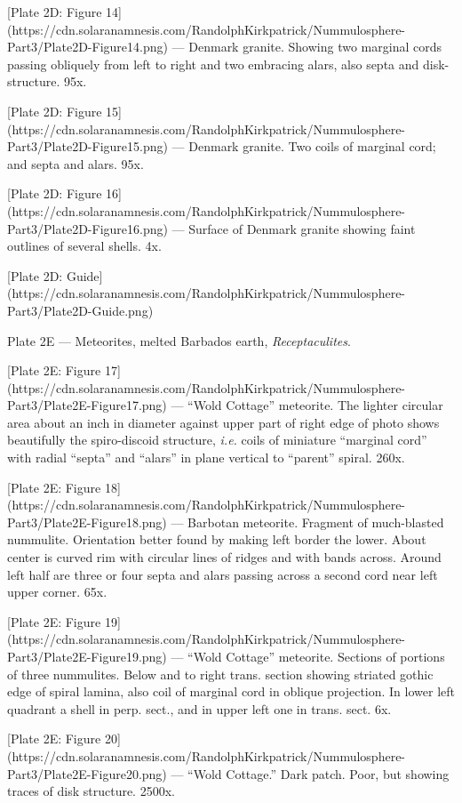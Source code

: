\documentclass[a4paper, 12pt, oneside]{article}
\begin{document}
[Plate 2D: Figure 14](https://cdn.solaranamnesis.com/RandolphKirkpatrick/Nummulosphere-Part3/Plate2D-Figure14.png) --- Denmark granite. Showing two marginal cords passing obliquely from left to right and two embracing alars, also septa and disk-structure. 95x.

[Plate 2D: Figure 15](https://cdn.solaranamnesis.com/RandolphKirkpatrick/Nummulosphere-Part3/Plate2D-Figure15.png) --- Denmark granite. Two coils of marginal cord; and septa and alars. 95x.

[Plate 2D: Figure 16](https://cdn.solaranamnesis.com/RandolphKirkpatrick/Nummulosphere-Part3/Plate2D-Figure16.png) --- Surface of Denmark granite showing faint outlines of several shells. 4x.

[Plate 2D: Guide](https://cdn.solaranamnesis.com/RandolphKirkpatrick/Nummulosphere-Part3/Plate2D-Guide.png)

Plate 2E --- Meteorites, melted Barbados earth, \emph{Receptaculites}.

[Plate 2E: Figure 17](https://cdn.solaranamnesis.com/RandolphKirkpatrick/Nummulosphere-Part3/Plate2E-Figure17.png) --- ``Wold Cottage'' meteorite. The lighter circular area about an inch in diameter against upper part of right edge of photo shows beautifully the spiro-discoid structure, \emph{i.e.} coils of miniature ``marginal cord'' with radial ``septa'' and ``alars'' in plane vertical to ``parent'' spiral. 260x.

[Plate 2E: Figure 18](https://cdn.solaranamnesis.com/RandolphKirkpatrick/Nummulosphere-Part3/Plate2E-Figure18.png) --- Barbotan meteorite. Fragment of much-blasted nummulite. Orientation better found by making left border the lower. About center is curved rim with circular lines of ridges and with bands across. Around left half are three or four septa and alars passing across a second cord near left upper corner. 65x.

[Plate 2E: Figure 19](https://cdn.solaranamnesis.com/RandolphKirkpatrick/Nummulosphere-Part3/Plate2E-Figure19.png) --- ``Wold Cottage'' meteorite. Sections of portions of three nummulites. Below and to right trans. section showing striated gothic edge of spiral lamina, also coil of marginal cord in oblique projection. In lower left quadrant a shell in perp. sect., and in upper left one in trans. sect. 6x.

[Plate 2E: Figure 20](https://cdn.solaranamnesis.com/RandolphKirkpatrick/Nummulosphere-Part3/Plate2E-Figure20.png) --- ``Wold Cottage.'' Dark patch. Poor, but showing traces of disk structure. 2500x.
\end{document}
